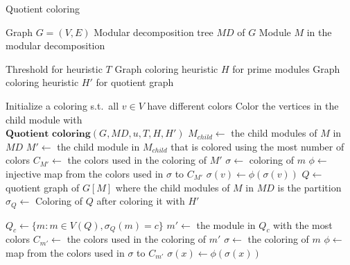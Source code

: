 \documentclass[a4paper]{article}
\begin{document}
\begin{algorithm}[H]
\caption{Quotient coloring}
\begin{algorithmic}[1]
    \REQUIRE Graph $G = (V,E)$ 
    \REQUIRE Modular decomposition tree $MD$ of $G$
    \REQUIRE Module $M$ in the modular decomposition

    \REQUIRE Threshold for heuristic $T$
    \REQUIRE Graph coloring heuristic $H$ for prime modules
    \REQUIRE Graph coloring heuristic $H'$ for quotient graph

    \STATE Initialize a coloring s.t.\ all $v \in V$
           have different colors
        \STATE Color the vertices in the child module with \\
        $\textbf{Quotient coloring}(G,MD,u,T,H,H')$
    \ENDFOR
      \STATE $M_{child} \leftarrow $ the child modules of $M$ in $MD$
      \STATE $M' \leftarrow $ the child module in $M_{child}$ that is colored using the most number of colors
      \STATE $C_{M'} \leftarrow $ the colors used in the coloring of $M'$
         \STATE $\sigma \leftarrow $ coloring of $m$
         \STATE $\phi \leftarrow $ injective map from the colors used in $\sigma$ to $C_{M'}$
            \STATE $\sigma(v)\leftarrow \phi(\sigma(v))$  
         \ENDFOR
      \ENDFOR
            \RETURN
        \ENDIF
        \STATE $Q \leftarrow $ quotient graph of $G[M]$ where the child modules of $M$ in $MD$ is the partition
        \STATE $\sigma_Q \leftarrow $ Coloring of $Q$ after coloring it with $H'$

            \STATE $Q_c \leftarrow \{ m : m \in V(Q), \sigma_Q(m) = c\}$
            \STATE $m' \leftarrow$ the module in $Q_c$ with the most colors
            \STATE $C_{m'} \leftarrow$ the colors used in the coloring of $m'$
                \STATE $\sigma \leftarrow $ the coloring of $m$
                \STATE $\phi \leftarrow $ map from the colors used in $\sigma$ to $C_{m'}$
                    \STATE $\sigma(x) \leftarrow \phi(\sigma(x))$
                \ENDFOR
            \ENDFOR
        \ENDFOR
    \ENDIF
\end{algorithmic}
\end{algorithm}
\end{document}
